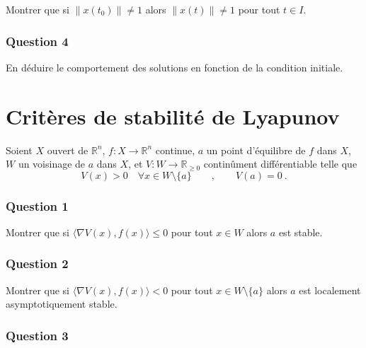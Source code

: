 
Montrer que si \(\|x(t_0)\|\neq 1\) alors \(\|x(t)\|\neq 1\) pour tout
\(t\in I\).

\hypertarget{cycle-lim-4}{%
\subsubsection*{Question 4}\label{cycle-lim-4}}


En déduire le comportement des solutions en fonction de la condition
initiale.

\hypertarget{exo_lyap}{%
\section{Critères de stabilité de Lyapunov}\label{exo_lyap}}

Soient \(X\) ouvert de \(\mathbb{R}^n\), \(f: X \to \mathbb{R}^n\)
continue, \(a\) un point d'équilibre de \(f\) dans \(X\), \(W\) un
voisinage de \(a\) dans \(X\), et \(V:W\to\mathbb{R}_{\geq 0}\)
continûment différentiable telle que \[
V(x) > 0 \quad  \forall x\in W\setminus\{a\} \qquad , \qquad V(a)= 0 \ .
\]

\hypertarget{lyap-1}{%
\subsubsection*{Question 1}\label{lyap-1}}


Montrer que si \(\langle\nabla V (x), f(x)\rangle \leq 0\) pour tout
\(x\in W\) alors \(a\) est stable.

\hypertarget{lyap-2}{%
\subsubsection*{Question 2}\label{lyap-2}}


Montrer que si \(\langle \nabla V (x), f(x) \rangle < 0\) pour tout
\(x\in W\setminus \{a\}\) alors \(a\) est localement asymptotiquement
stable.

\hypertarget{lyap-3}{%
\subsubsection*{Question 3}\label{lyap-3}}

